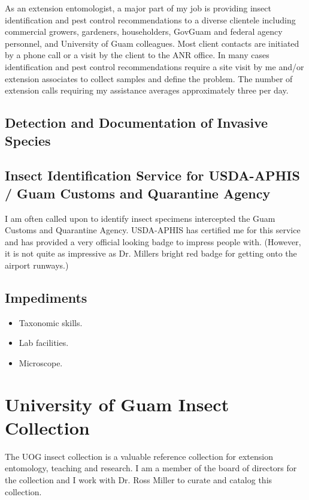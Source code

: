 \documentclass[12pt,oneside,english]{scrbook}
\begin{document}
As an extension entomologist, a major part of my job is providing
insect identification and pest control recommendations to a diverse
clientele including commercial growers, gardeners, householders, GovGuam
and federal agency personnel, and University of Guam colleagues. Most client contacts are initiated by
a phone call or a visit by the client to the ANR office. In many cases
identification and pest control recommendations require a site visit
by me and/or extension associates to collect samples and define the
problem. The number of extension calls requiring my assistance averages
approximately three per day. 

\subsection{Detection and Documentation of Invasive Species}

\subsection{Insect Identification Service for USDA-APHIS / Guam Customs and Quarantine
Agency}

I am often called upon to identify insect specimens intercepted the
Guam Customs and Quarantine Agency. USDA-APHIS has certified me for
this service and has provided a very official looking badge to impress
people with. (However, it is not quite as impressive as Dr. Millers
bright red badge for getting onto the airport runways.)

\subsection{Impediments}
\begin{itemize}
\item Taxonomic skills.
\item Lab facilities.
\item Microscope.
\end{itemize}

\section{University of Guam Insect Collection}

The UOG insect collection is a valuable reference collection for extension
entomology, teaching and research. I am a member of the board of directors
for the collection and I work with Dr. Ross Miller to curate and catalog
this collection. 
\end{document}
